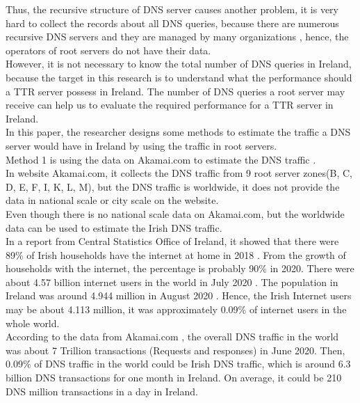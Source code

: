 Thus, the recursive structure of DNS server causes another problem, it is very hard to collect the records about all DNS queries, because there are numerous recursive DNS servers and they are managed by many organizations \cite{Authoritative_and_recursive_DNS}, hence, the operators of root servers do not have their data.
\\

However, it is not necessary to know the total number of DNS queries in Ireland, because the target in this research is to understand what the performance should a TTR server possess in Ireland. The number of DNS queries a root server may receive can help us to evaluate the required performance for a TTR server in Ireland.
\\

In this paper, the researcher designs some methods to estimate the traffic a DNS server would have in Ireland by using the traffic in root servers.
\\

Method 1 is using the data on Akamai.com to estimate the DNS traffic \cite{overall_DNS_traffic_trends}.
\\

In website Akamai.com, it collects the DNS traffic from 9 root server zones(B, C, D, E, F, I, K, L, M), but the DNS traffic is worldwide, it does not provide the data in national scale or city scale on the website.
\\

Even though there is no national scale data on Akamai.com, but the worldwide data can be used to estimate the Irish DNS traffic.
\\

In a report from Central Statistics Office of Ireland, it showed that there were 89\% of Irish households have the internet at home in 2018 \cite{Irish_households_with_internet}. From the growth of households with the internet, the percentage is probably 90\% in 2020. There were about 4.57 billion internet users in the world in July 2020 \cite{Global_digital_population_July_2020}. The population in Ireland was around 4.944 million in August 2020 \cite{Ireland_population}. Hence, the Irish Internet users may be about 4.113 million, it was approximately 0.09\% of internet users in the whole world.
\\

According to the data from Akamai.com \cite{overall_DNS_traffic_trends}, the overall DNS traffic in the world was about 7 Trillion transactions (Requests and responses) in June 2020. 
Then, 0.09\% of DNS traffic in the world could be Irish DNS traffic, which is around 6.3 billion DNS transactions for one month in Ireland. On average, it could be 210 DNS million transactions in a day in Ireland.
\\

